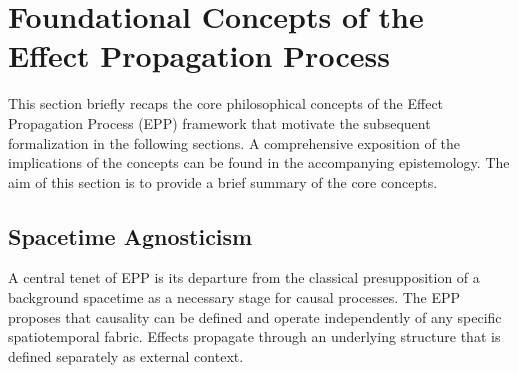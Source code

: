 

\section{Foundational Concepts of the Effect Propagation Process}
\label{sec:epp_foundations_recap}

This section briefly recaps the core philosophical concepts of the Effect Propagation Process (EPP) framework\cite{Hansen2025EPP} that motivate the subsequent formalization in the following sections. A comprehensive exposition of the implications of the concepts can be found in the accompanying epistemology\cite{Hansen2025EPP_Epistemology}. The aim of this section is to provide a brief summary of the core concepts.
    
\subsection{Spacetime Agnosticism}
\label{ssec:recap_spacetime_agnosticism}

A central tenet of EPP is its departure from the classical presupposition of a background spacetime as a necessary stage for causal processes. The EPP proposes that causality can be defined and operate independently of any specific spatiotemporal fabric. 
Effects propagate through an underlying structure that is defined separately as external context. 

